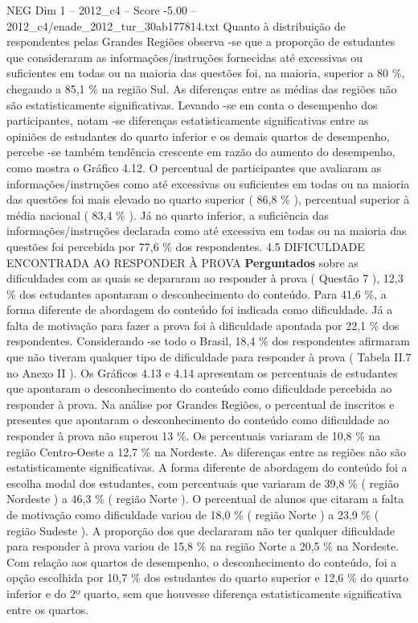 \begin{textsample}{NEG Dim 1 – 2012\_c4 – Score -5.00 – 2012\_c4/enade\_2012\_tur\_30ab177814.txt}
Quanto à distribuição de respondentes pelas Grandes Regiões observa -se que a proporção de estudantes que consideraram as informações/instruções fornecidas até excessivas ou suficientes em todas ou na maioria das questões foi, na maioria, superior a 80 \%, chegando a 85,1 \% na região Sul.
As diferenças entre as médias das regiões não são estatisticamente significativas.
Levando -se em conta o desempenho dos participantes, notam -se diferenças estatisticamente significativas entre as opiniões de estudantes do quarto inferior e os demais quartos de desempenho, percebe -se também tendência crescente em razão do aumento do desempenho, como mostra o Gráfico 4.12.
O percentual de participantes que avaliaram as informações/instruções como até excessivas ou suficientes em todas ou na maioria das questões foi mais elevado no quarto superior ( 86,8 \% ), percentual superior à média nacional ( 83,4 \% ).
Já no quarto inferior, a suficiência das informações/instruções declarada como até excessiva em todas ou na maioria das questões foi percebida por 77,6 \% dos respondentes. 4.5 DIFICULDADE ENCONTRADA AO RESPONDER À PROVA \textbf{Perguntados} sobre as dificuldades com as quais se depararam ao responder à prova ( Questão 7 ), 12,3 \% dos estudantes apontaram o desconhecimento do conteúdo.
Para 41,6 \%, a forma diferente de abordagem do conteúdo foi indicada como dificuldade.
Já a falta de motivação para fazer a prova foi à dificuldade apontada por 22,1 \% dos respondentes.
Considerando -se todo o Brasil, 18,4 \% dos respondentes afirmaram que não tiveram qualquer tipo de dificuldade para responder à prova ( Tabela II.7 no Anexo II ).
Os Gráficos 4.13 e 4.14 apresentam os percentuais de estudantes que apontaram o desconhecimento do conteúdo como dificuldade percebida ao responder à prova.
Na análise por Grandes Regiões, o percentual de inscritos e presentes que apontaram o desconhecimento do conteúdo como dificuldade ao responder à prova não superou 13 \%.
Os percentuais variaram de 10,8 \% na região Centro-Oeste a 12,7 \% na Nordeste.
As diferenças entre as regiões não são estatisticamente significativas.
A forma diferente de abordagem do conteúdo foi a escolha modal dos estudantes, com percentuais que variaram de 39,8 \% ( região Nordeste ) a 46,3 \% ( região Norte ).
O percentual de alunos que citaram a falta de motivação como dificuldade variou de 18,0 \% ( região Norte ) a 23,9 \% ( região Sudeste ).
A proporção dos que declararam não ter qualquer dificuldade para responder à prova variou de 15,8 \% na região Norte a 20,5 \% na Nordeste.
Com relação aos quartos de desempenho, o desconhecimento do conteúdo, foi a opção escolhida por 10,7 \% dos estudantes do quarto superior e 12,6 \% do quarto inferior e do 2º quarto, sem que houvesse diferença estatisticamente significativa entre os quartos.

\end{textsample}
